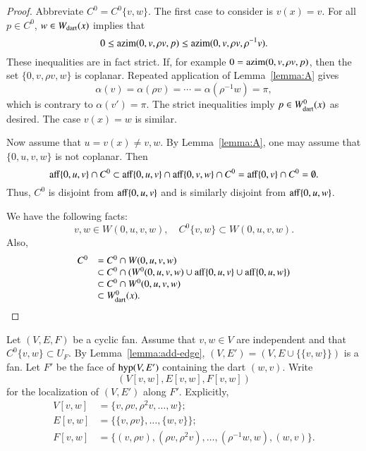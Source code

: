 \begin{proof}  Abbreviate $C^0 = C^0\{v,w\}$.  The first case to consider is $v(x)=v$.  For all $p\in C^0$, 
$w\in W_{\text{dart}}(x)$ implies that
$$
0 \le {\operatorname{azim}}(0,v,\rho v,p) \le {\operatorname{azim}}(0,v,\rho v,\rho^{-1} v).
$$  
These inequalities are in fact strict.  If, for example $0 = {\operatorname{azim}}(0,v,\rho v,p)$, then
the set $\{0,v,\rho v,w\}$ is coplanar.  Repeated application of Lemma~\ref{lemma:A} gives
$$
\alpha(v) = \alpha(\rho v) = \cdots = \alpha(\rho^{-1} w) = \pi,
$$
which is contrary to $\alpha(v') = \pi$.  
The strict inequalities imply $p\in W^0_{\text{dart}}(x)$ as desired.  The case $v(x)=w$ is similar.

Now assume that $u=v(x)\ne v,w$.  
By Lemma~\ref{lemma:A},  one may assume that $\{0,u,v,w\}$ is not coplanar.  Then
$$
{\operatorname{aff}}\{0,u,v\}\cap C^0 \subset {\operatorname{aff}}\{0,u,v\}\cap {\operatorname{aff}}\{0,v,w\} \cap C^0 = {\operatorname{aff}}\{0,v\} \cap C^0 = \emptyset.
$$
Thus, $C^0$ is disjoint from ${\operatorname{aff}}\{0,u,v\}$ and is similarly disjoint from ${\operatorname{aff}}\{0,u,w\}$.  

We have the following facts:
$$
v,w\in W(0,u,v,w),\quad C^0\{v,w\} \subset W(0,u,v,w).
$$
Also,
$$
\begin{array}{rll}
C^0 &= C^0\cap W(0,u,v,w) \\
     &\subset C^0 \cap (W^0(0,u,v,w) \cup {\operatorname{aff}}\{0,u,v\} \cup {\operatorname{aff}}\{0,u,w\})\\
     &\subset C^0 \cap W^0(0,u,v,w)\\
     &\subset W^0_{\text{dart}}(x).
\end{array}
$$
\end{proof}


\begin{definition} Let $(V,E,F)$ be a cyclic fan.  Assume that $v,w\in V$ are
independent and that $C^0\{v,w\}\subset U_F$.  By Lemma~\ref{lemma:add-edge},
$(V,E')=(V,E\cup \{\{v,w\}\})$ is a fan.  Let $F'$ be the face of ${\operatorname{hyp}}(V,E')$ 
containing the dart $(w,v)$.  Write
$$(V[v,w],E[v,w],F[v,w])$$
for the localization of $(V,E')$ along $F'$.  Explicitly,
$$
\begin{array}{lll}
V[v,w] &= \{v,\rho v,\rho^2 v,\ldots,w\};\\
E[v,w] &= \{\{v,\rho v\},\ldots,\{w,v\}\};\\
F[v,w] &= \{(v,\rho v),(\rho v,\rho^2 v),\ldots,(\rho^{-1}w,w),(w,v)\}.
\end{array}
$$
\end{definition}

